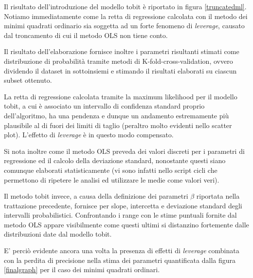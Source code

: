 \documentclass[12pt,openright,twoside,a4paper]{book}
\begin{document}
Il risultato dell'introduzione del modello tobit è riportato in figura \ref{truncatedml}.
Notiamo immediatamente come la retta di regressione calcolata con il metodo dei minimi quadrati ordinario sia soggetta ad un forte fenomeno di \textit{leverage}, causato dal troncamento di cui il metodo OLS non tiene conto.

Il risultato dell'elaborazione fornisce inoltre i parametri  risultanti stimati come distribuzione di probabilità tramite metodi di K-fold-cross-validation, ovvero dividendo il dataset in sottoinsiemi e stimando il risultati elaborati su ciascun subset ottenuto.

La retta di regressione calcolata tramite la maximum likelihood per il modello tobit, a cui è associato un intervallo di confidenza standard proprio dell'algoritmo, ha una pendenza e dunque un andamento estremamente più plausibile al di fuori dei limiti di taglio (peraltro molto evidenti nello scatter plot).
L'effetto di \textit{leverage} è in questo modo compensato.

Si nota inoltre come il metodo OLS preveda dei valori discreti per i parametri di regressione ed il calcolo della deviazione standard, nonostante questi siano comunque elaborati statisticamente (vi sono infatti nello script cicli che permettono di ripetere le analisi ed utilizzare le medie come valori veri).

Il metodo tobit invece, a causa della definizione dei parametri $\beta$ riportata nella trattazione precedente, fornisce per slope, intercetta e deviazione standard degli intervalli probabilistici.
Confrontando i range con le stime puntuali fornite dal metodo OLS appare visibilmente come questi ultimi si distanzino fortemente dalle distribuzioni date dal modello tobit.

E' perciò evidente ancora una volta la presenza di effetti di \textit{leverage} combinata con la perdita di precisione nella stima dei parametri quantificata dalla figura \ref{finalgraph} per il caso dei minimi quadrati ordinari.
\end{document}
